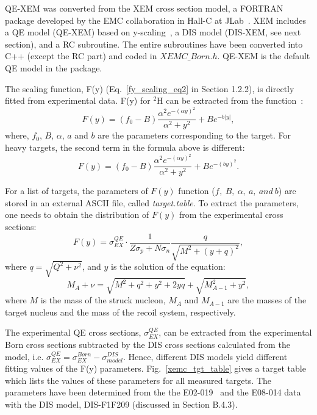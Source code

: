  QE-XEM was converted from the XEM cross section model, a FORTRAN package developed by the EMC collaboration in Hall-C at JLab~\cite{nadia_thesis,aji_thesis}. XEM includes a QE model (QE-XEM) based on y-scaling~\cite{West1975263,PhysRevC.41.R2474,Boffi19931,john_thesis}, a DIS model (DIS-XEM, see next section), and a RC subroutine. The entire subroutines have been converted into C++ (except the RC part) and coded in \emph{$XEMC\_Born.h$}. QE-XEM is the default QE model in the package.
 
  The scaling function, F(y) (Eq.~\eqref{fy_scaling_eq2} in Section 1.2.2), is directly fitted from experimental data. F(y) for $\mathrm{^{2}H}$ can be extracted from the function~\cite{PhysRevLett.56.1452}:
  \begin{equation}
  F(y) = (f_{0}-B)\frac{\alpha^{2}e^{-(\alpha y)^{2}}}{\alpha^{2}+y^{2}} + B e^{-b|y|},
  \label{fy_fit_func1}
  \end{equation}
where, $f_{0}$, $B$, $\alpha$, $a$ and $b$ are the parameters corresponding to the target. For heavy targets, the second term in the formula above is different:
  \begin{equation}
  F(y) = (f_{0}-B)\frac{\alpha^{2}e^{-(\alpha y)^{2}}}{\alpha^{2}+y^{2}} + B e^{-(by)^{2}}.
    \label{fy_fit_func2}
  \end{equation}

  For a list of targets, the parameters of $F(y)$ function ($f_{},~B,~\alpha,~a,~and~b$) are stored in an external ASCII file, called \emph{target.table}. To extract the parameters, one needs to  obtain the distribution of $F(y)$ from the experimental cross sections:
  \begin{equation}
   F(y) = \sigma_{EX}^{QE}\cdot\frac{1}{Z\sigma_{p}+N\sigma_{n}}\frac{q}{\sqrt{M^{2}+(y+q)^{2}}},
  \end{equation}
where $q=\sqrt{Q^{2}+\nu^{2}}$, and $y$ is the solution of the equation:
\begin{equation}
  M_{A}+\nu = \sqrt{M^{2}+q^{2}+y^{2}+2yq}+\sqrt{M_{A-1}^{2}+y^{2}},
\end{equation}
where $M$ is the mass of the struck nucleon, $M_{A}$ and $M_{A-1}$ are the masses of the target nucleus and the mass of the recoil system, respectively.

 The experimental QE cross sections, $\sigma_{EX}^{QE}$, can be extracted from the experimental Born cross sections subtracted by the DIS cross sections calculated from the model, i.e. $\sigma_{EX}^{QE}=\sigma_{EX}^{Born}-\sigma_{model}^{DIS}$. Hence, different DIS models yield different fitting values of the F(y) parameters. Fig.~\ref{xemc_tgt_table} gives a target table which lists the values of these parameters for all measured targets. The parameters have been determined from the the E02-019~\cite{nadia_thesis} and the E08-014 data with the DIS model, DIS-F1F209 (discussed in Section B.4.3). 
 
